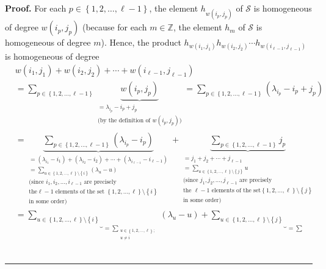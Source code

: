 \documentclass[numbers=enddot,12pt,final,onecolumn,notitlepage]{scrartcl}%
\theoremstyle{definition}
\newenvironment{proof}[1][Proof]{\noindent\textbf{#1.} }{\ \rule{0.5em}{0.5em}}
\let\sumnonlimits\sum
\renewcommand{\sum}{\sumnonlimits\limits}
\begin{document}
\begin{proof}
For each $p\in\left\{  1,2,\ldots,\ell-1\right\}  $, the element $h_{w\left(
i_{p},j_{p}\right)  }$ of $\mathcal{S}$ is homogeneous of degree $w\left(
i_{p},j_{p}\right)  $ (because for each $m\in\mathbb{Z}$, the element $h_{m}$
of $\mathcal{S}$ is homogeneous of degree $m$). Hence, the product
$h_{w\left(  i_{1},j_{1}\right)  }h_{w\left(  i_{2},j_{2}\right)  }\cdots
h_{w\left(  i_{\ell-1},j_{\ell-1}\right)  }$ is homogeneous of degree
\begin{align*}
&  w\left(  i_{1},j_{1}\right)  +w\left(  i_{2},j_{2}\right)  +\cdots+w\left(
i_{\ell-1},j_{\ell-1}\right) \\
&  =\sum_{p\in\left\{  1,2,\ldots,\ell-1\right\}  }\underbrace{w\left(
i_{p},j_{p}\right)  }_{\substack{=\lambda_{i_{p}}-i_{p}+j_{p}\\\text{(by the
definition of }w\left(  i_{p},j_{p}\right)  \text{)}}}=\sum_{p\in\left\{
1,2,\ldots,\ell-1\right\}  }\left(  \lambda_{i_{p}}-i_{p}+j_{p}\right) \\
&  =\underbrace{\sum_{p\in\left\{  1,2,\ldots,\ell-1\right\}  }\left(
\lambda_{i_{p}}-i_{p}\right)  }_{\substack{=\left(  \lambda_{i_{1}}%
-i_{1}\right)  +\left(  \lambda_{i_{2}}-i_{2}\right)  +\cdots+\left(
\lambda_{i_{\ell-1}}-i_{\ell-1}\right)  \\=\sum_{u\in\left\{  1,2,\ldots
,\ell\right\}  \setminus\left\{  i\right\}  }\left(  \lambda_{u}-u\right)
\\\text{(since }i_{1},i_{2},\ldots,i_{\ell-1}\text{ are precisely}\\\text{the
}\ell-1\text{ elements of the set }\left\{  1,2,\ldots,\ell\right\}
\setminus\left\{  i\right\}  \\\text{in some order)}}}+\underbrace{\sum
_{p\in\left\{  1,2,\ldots,\ell-1\right\}  }j_{p}}_{\substack{=j_{1}%
+j_{2}+\cdots+j_{\ell-1}\\=\sum_{u\in\left\{  1,2,\ldots,\ell\right\}
\setminus\left\{  j\right\}  }u\\\text{(since }j_{1},j_{2},\ldots,j_{\ell
-1}\text{ are precisely}\\\text{the }\ell-1\text{ elements of the set
}\left\{  1,2,\ldots,\ell\right\}  \setminus\left\{  j\right\}  \\\text{in
some order)}}}\\
&  =\underbrace{\sum_{u\in\left\{  1,2,\ldots,\ell\right\}  \setminus\left\{
i\right\}  }}_{=\sum_{\substack{u\in\left\{  1,2,\ldots,\ell\right\}  ;\\u\neq
i}}}\left(  \lambda_{u}-u\right)  +\underbrace{\sum_{u\in\left\{
1,2,\ldots,\ell\right\}  \setminus\left\{  j\right\}  }}_{=\sum
}
\end{align*}
\end{proof}
\end{document}
